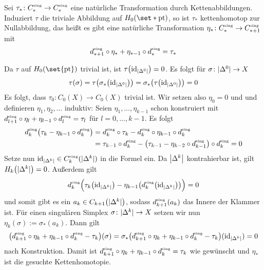 \begin{proposition}[label=prop:H0_kettenhomotop,{name=[Nullkettenhomotopie von natürlichen Transformationen]}]
	Sei $\tau_* \colon C_*^\sing \to C_*^\sing$ eine natürliche Transformation durch Kettenabbildungen. 
	Induziert $\tau$ die triviale Abbildung auf $H_0(\set*{\pt})$, so ist $\tau_*$ kettenhomotop zur Nullabbildung, das heißt es gibt eine natürliche Transformation $\eta_* \colon C_*^\sing \to C_{*+1}^\sing$ mit 
	\[
		d^\sing_{*+1} \circ \eta_* + \eta_{*-1} \circ d_*^\sing = \tau_* 
	\]
\end{proposition}
\begin{beweis}
	Da $\tau$ auf $H_0(\set{\pt})$ trivial ist, ist $\tau \enbrace*{\id_{\abs*{\Delta^0}}}=0$. Es folgt für $\sigma \colon \abs{\Delta^0} \to X$
	\[
		\tau(\sigma) = \tau \enbrace*{\sigma_* \enbrace*{\id_{\abs*{\Delta^0}}}} = \sigma_* \enbrace*{\tau \enbrace*{\id_{\abs*{\Delta^0}}}} = 0
	\]
	Es folgt, dass $\tau_0 \colon C_0(X) \to C_0(X)$ trivial ist. 
	Wir setzen also $\eta_0 = 0$ und und definieren $\eta_1, \eta_2, \ldots $ induktiv: 
	Seien $\eta_1, \ldots,\eta_{k-1}$ schon konstruiert mit $d^\sing_{l+1} \circ \eta_l + \eta_{l-1} \circ d^\sing_{l}=\tau_l$ für $l=0, \ldots , k-1$. Es folgt
	\begin{align}
		d_k^\sing \enbrace*{\tau_k -  \eta_{k-1} \circ d_k^\sing } &= d^\sing_k \circ \tau_k - d^\sing_k \circ \eta_{k-1} \circ d^\sing_k \\
		&= \tau_{k-1} \circ d_k^\sing -  \enbrace*{\tau_{k-1} - \eta_{k-2} \circ d_{k-1}^\sing} \circ d_k^\sing =0
	\end{align}
	Setze nun $\id_{\abs*{\Delta^k}} \in C_k^\sing( \abs{\Delta^k})$ in die Formel ein. 
	Da $\abs*{\Delta^k}$ kontrahierbar ist, gilt $H_k \enbrace*{\abs{\Delta^k}} =0$. Außerdem gilt
	\[
		d_k^\sing \enbrace[\Big]{\tau_k \enbrace*{\id_{\abs*{\Delta^k} }} - \eta_{k-1} \enbrace*{d_k^\sing \enbrace*{\id_{\abs*{\Delta^k} }}}} =0
	\]
	und somit gibt es ein $a_k \in C_{k+1} \enbrace*{\abs{\Delta^k} }$, sodass $d_{k+1}^\sing(a_k)$ das Innere der Klammer ist. 
	Für einen singulären Simplex $\sigma \colon \abs{\Delta^k} \to X$ setzen wir nun $\eta_k(\sigma) := \sigma_*(a_k)$.
	Dann gilt 
	\[
		\enbrace*{d_{k+1}^\sing \circ \eta_k + \eta_{k-1} \circ d_k^\sing - \tau_k}(\sigma) = \sigma_* \enbrace[\big]{d_{k+1}^\sing \circ \eta_k + \eta_{k-1} \circ d_k^\sing - \tau_k} (\id_{\abs*{\Delta^k}}) =0 
	\]
	nach Konstruktion.
	Damit ist $d_{k+1}^\sing \circ \eta_k + \eta_{k-1} \circ d_k^\sing = \tau_k$ wie gewünscht und $\eta_*$ ist die gesuchte Kettenhomotopie.
\end{beweis}

